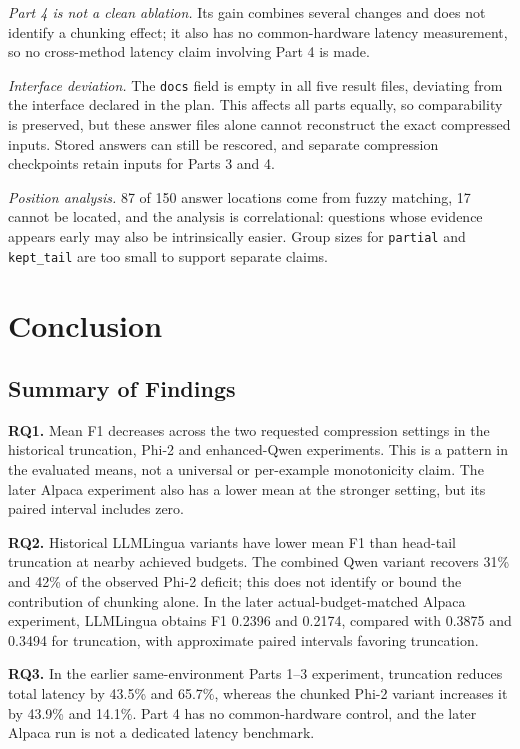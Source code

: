 \documentclass[10pt,a4paper,twocolumn]{article}
\begin{document}
\emph{Part 4 is not a clean ablation.} Its gain combines several changes and does not identify a chunking effect; it also has no common-hardware latency measurement, so no cross-method
latency claim involving Part 4 is made.

\emph{Interface deviation.} The \texttt{docs} field is empty in all five result
files, deviating from the interface declared in the plan. This affects all parts
equally, so comparability is preserved, but these answer files alone cannot reconstruct the exact compressed inputs. Stored answers can still be rescored, and separate compression checkpoints retain inputs for Parts 3 and 4.

\emph{Position analysis.} 87 of 150 answer locations come from fuzzy matching, 17
cannot be located, and the analysis is correlational: questions whose evidence
appears early may also be intrinsically easier. Group sizes for
\texttt{partial} and \texttt{kept\_tail} are too small to support separate claims.

\section{Conclusion}

\subsection{Summary of Findings}

\textbf{RQ1.} Mean F1 decreases across the two requested compression settings in
the historical truncation, Phi-2 and enhanced-Qwen experiments. This is a pattern
in the evaluated means, not a universal or per-example monotonicity claim.
The later Alpaca experiment also has a lower mean at the stronger setting, but
its paired interval includes zero.

\textbf{RQ2.} Historical LLMLingua variants have lower mean F1 than head-tail
truncation at nearby achieved budgets. The combined Qwen variant recovers
31\% and 42\% of the observed Phi-2 deficit; this does not identify or bound
the contribution of chunking alone. In the later actual-budget-matched Alpaca
experiment, LLMLingua obtains F1 0.2396 and 0.2174, compared with 0.3875 and
0.3494 for truncation, with approximate paired intervals favoring truncation.

\textbf{RQ3.} In the earlier same-environment Parts 1--3 experiment, truncation
reduces total latency by 43.5\% and 65.7\%, whereas the chunked Phi-2 variant
increases it by 43.9\% and 14.1\%. Part 4 has no common-hardware control, and
the later Alpaca run is not a dedicated latency benchmark.
\end{document}

